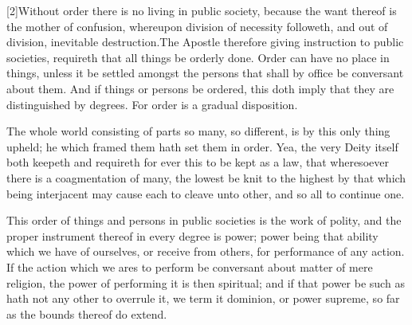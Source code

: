 [2]Without order there is no living in public society, because the want thereof is the mother of confusion, whereupon division of necessity followeth, and out of division, inevitable destruction.The Apostle therefore giving instruction to public societies, requireth that all things be orderly done. Order can have no place in things, unless it be settled amongst the persons that shall by office be conversant about them. And if things or persons be ordered,  this doth imply that they are distinguished by degrees. For order is a gradual disposition.

The whole world consisting of parts so many, so different, is by this only thing upheld; he which framed them hath set them in order. Yea, the very Deity itself both keepeth and requireth for ever this to be kept as a law, that wheresoever there is a coagmentation of many, the lowest be knit to the highest by that which being interjacent may cause each to cleave unto other, and so all to continue one.

This order of things and persons in public societies is the work of polity, and the proper instrument thereof in every degree is power; power being that ability which we have of ourselves, or receive from others, for performance of any action. If the action which we ares to perform be conversant about matter of mere religion, the power of performing it is then spiritual; and if that power be such as hath not any other to overrule it, we term it dominion, or power supreme, so far as the bounds thereof do extend.

